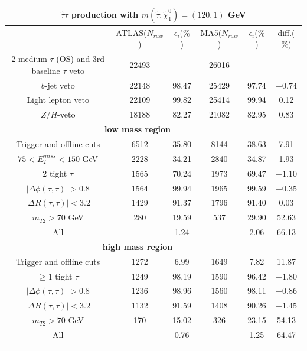 \documentclass{ws-mpla}
\begin{document}
\begin{table}[h!]
  {\begin{tabular}{@{}c c c c c c@{}} \toprule
\hline
\multicolumn{6}{c}{ \textbf{$ \tilde{\tau}\tilde{\tau} $ production with $ m(\tilde{\tau},\tilde{\chi}^0_1) = (120,1) $ GeV} }\\
\hline\hline
 & ATLAS($N_{raw}$) & $\epsilon_i$($\%$) & MA5($N_{raw}$) & $\epsilon_i$($\%$) & diff.($\%$) \\
\hline\hline

2 medium $\tau$ (OS) and 3rd baseline $\tau$ veto & 22493 & & 26016 & & \\ \hline
$b$-jet veto & 22148 & 98.47 & 25429 & 97.74 & $-0.74$ \\ \hline
Light lepton veto & 22109 & 99.82 & 25414 & 99.94 & 0.12 \\ \hline
$Z/H$-veto & 18188 & 82.27 & 21082 & 82.95 & 0.83 \\ \hline
%
\multicolumn{5}{c}{ \textbf{low mass region} }\\\hline
%
Trigger and offline cuts & 6512 & 35.80 & 8144 & 38.63 & 7.91 \\ \hline
$ 75 < E^{miss}_T < 150 $ GeV & 2228 & 34.21 & 2840 & 34.87 & 1.93 \\ \hline
2 tight $\tau$ & 1565 & 70.24 & 1973 & 69.47 & $-1.10$ \\ \hline
$ |\Delta\phi(\tau,\tau)| > 0.8 $ & 1564 & 99.94 & 1965 & 99.59 & $-0.35$ \\ \hline
$ |\Delta R(\tau,\tau)| < 3.2 $ & 1429 & 91.37 & 1796 & 91.40 & 0.03 \\ \hline
$ m_{T2} > 70 $ GeV & 280 & 19.59 & 537 & 29.90 & 52.63 \\ \hline
All &  & 1.24 &  & 2.06 & 66.13 \\ \hline
%
\hline
\multicolumn{5}{c}{ \textbf{high mass region} }\\\hline
%
Trigger and offline cuts & 1272 & 6.99 & 1649 & 7.82 & 11.87 \\ \hline
$ \geq 1 $ tight $\tau$ & 1249 & 98.19 & 1590 & 96.42 & $-1.80$ \\ \hline
$ |\Delta\phi(\tau,\tau)| > 0.8 $ & 1236 & 98.96 & 1560 & 98.11 & $-0.86$ \\ \hline
$ |\Delta R(\tau,\tau)| < 3.2 $ & 1132 & 91.59 & 1408 & 90.26 & $-1.45$ \\ \hline
$ m_{T2} > 70 $ GeV & 170 & 15.02 & 326 & 23.15 & 54.13 \\ \hline
All &  & 0.76 &  & 1.25 & 64.47 \\ \botrule
\end{tabular}
\label{tab:120GeV} }
\end{table}
\end{document}
